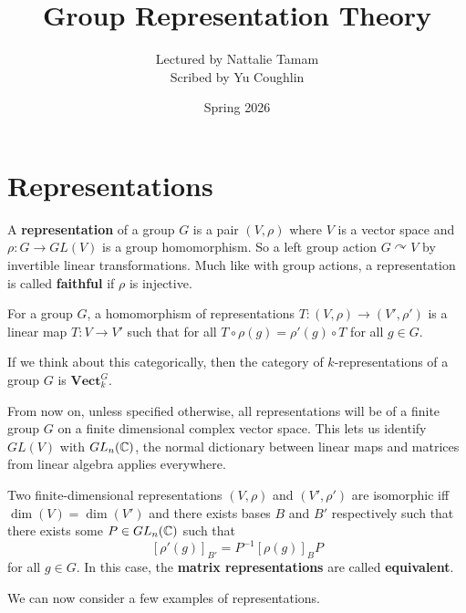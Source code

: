 \documentclass{article}
\begin{document}
\title{Group Representation Theory}
\author{Lectured by Nattalie Tamam \\
Scribed by Yu Coughlin}
\date{Spring 2026}

\maketitle

\tableofcontents

\section{Representations}

\begin{definition}
    A \textbf{representation} of a group $G$ is a pair $(V,\rho)$ where $V$ is a vector space and $\rho:G\rightarrow GL(V)$ is a group homomorphism. So a left group action $G\curvearrowright V$ by invertible linear transformations. Much like with group actions, a representation is called \textbf{faithful} if $\rho$ is injective.
\end{definition}

\begin{definition}
    For a group $G$, a homomorphism of representations $T:(V,\rho)\rightarrow(V',\rho')$ is a linear map $T:V\rightarrow V'$ such that for all $T\circ\rho(g)=\rho'(g)\circ T$ for all $g\in G$.
\end{definition}

If we think about this categorically, then the category of $k$-representations of a group $G$ is $\textbf{Vect}_k^G$.

From now on, unless specified otherwise, all representations will be of a finite group $G$ on a finite dimensional complex vector space. This lets us identify $GL(V)$ with $GL_n(\mathbb{C})$, the normal dictionary between linear maps and matrices from linear algebra applies everywhere.

\begin{lemma}
    Two finite-dimensional representations $(V,\rho)$ and $(V',\rho')$ are isomorphic iff $\dim(V)=\dim(V')$ and there exists bases $B$ and $B'$ respectively such that there exists some $P\in GL_n(\mathbb{C})$ such that \[
    [\rho'(g)]_{B'} = P^{-1}[\rho(g)]_BP
    \] for all $g\in G$. In this case, the \textbf{matrix representations} are called \textbf{equivalent}.
\end{lemma}

We can now consider a few examples of representations.
\end{document}

